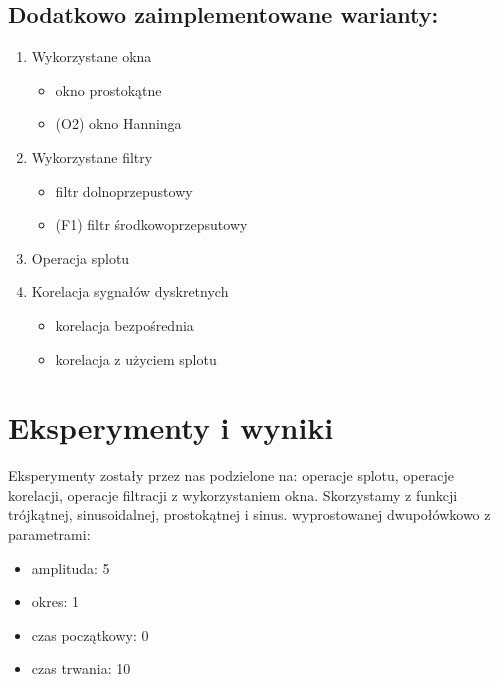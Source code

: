\documentclass[12pt]{article}
\begin{document}
\subsection {Dodatkowo zaimplementowane warianty:}
\begin {enumerate}
\item Wykorzystane okna
\begin {itemize}
 \item okno prostokątne
\item (O2) okno Hanninga
\end {itemize}
\item Wykorzystane filtry
\begin {itemize}
\item filtr dolnoprzepustowy
\item (F1) filtr środkowoprzepsutowy
\end {itemize}
\item  Operacja splotu  
\item Korelacja sygnałów dyskretnych 
\begin {itemize}
\item korelacja bezpośrednia
\item korelacja z użyciem splotu
\end {itemize}
\end{enumerate}

\section{Eksperymenty i wyniki}
Eksperymenty zostały przez nas podzielone na: operacje splotu, operacje korelacji, operacje filtracji z wykorzystaniem okna. Skorzystamy z funkcji trójkątnej, sinusoidalnej, prostokątnej i sinus. wyprostowanej dwupołówkowo z parametrami:
\begin{itemize}
\item amplituda: 5
\item okres: 1
\item czas początkowy: 0
\item czas trwania: 10
\end{itemize}
\end{document}
